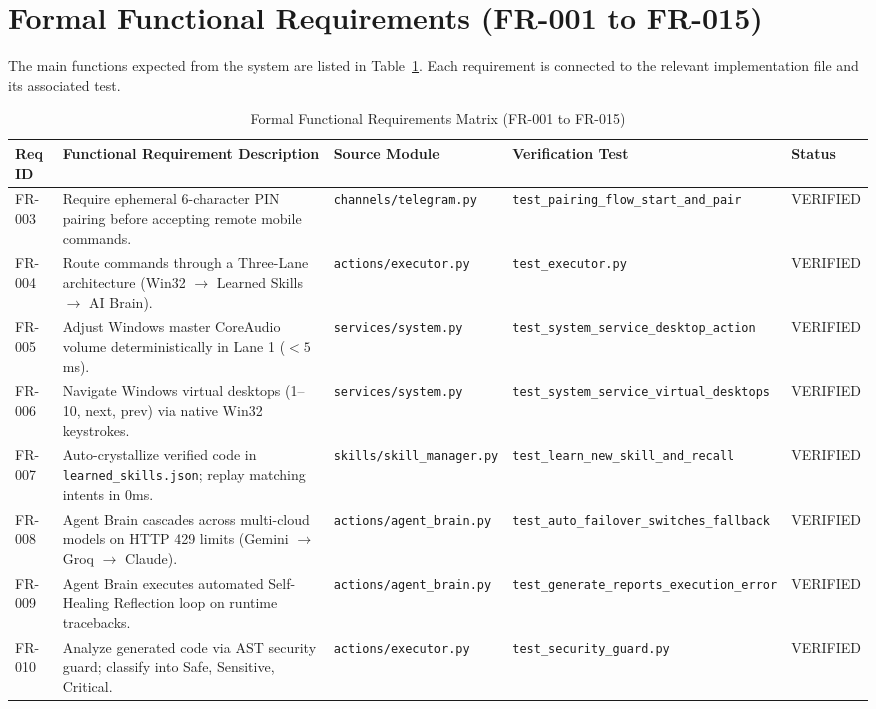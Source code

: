 \documentclass[12pt,letterpaper,oneside]{report}
\begin{document}
\section{Formal Functional Requirements (FR-001 to FR-015)}
The main functions expected from the system are listed in Table~\ref{tab:fr_matrix}. Each requirement is connected to the relevant implementation file and its associated test.

\begin{table}[H]
\centering
\caption{Formal Functional Requirements Matrix (FR-001 to FR-015)}
\label{tab:fr_matrix}
\begin{tabularx}{\textwidth}{|l|X|l|l|l|}
\hline
\textbf{Req ID} & \textbf{Functional Requirement Description} & \textbf{Source Module} & \textbf{Verification Test} & \textbf{Status}\\ \hline
FR-003 & Require ephemeral 6-character PIN pairing before accepting remote mobile commands. & \texttt{channels/telegram.py} & \texttt{test\_pairing\_flow\_start\_and\_pair} & VERIFIED\\ \hline
FR-004 & Route commands through a Three-Lane architecture (Win32 $\to$ Learned Skills $\to$ AI Brain). & \texttt{actions/executor.py} & \texttt{test\_executor.py} & VERIFIED\\ \hline
FR-005 & Adjust Windows master CoreAudio volume deterministically in Lane 1 ($<5$\,ms). & \texttt{services/system.py} & \texttt{test\_system\_service\_desktop\_action} & VERIFIED\\ \hline
FR-006 & Navigate Windows virtual desktops (1–10, next, prev) via native Win32 keystrokes. & \texttt{services/system.py} & \texttt{test\_system\_service\_virtual\_desktops} & VERIFIED\\ \hline
FR-007 & Auto-crystallize verified code in \texttt{learned\_skills.json}; replay matching intents in 0ms. & \texttt{skills/skill\_manager.py} & \texttt{test\_learn\_new\_skill\_and\_recall} & VERIFIED\\ \hline
FR-008 & Agent Brain cascades across multi-cloud models on HTTP 429 limits (Gemini $\to$ Groq $\to$ Claude). & \texttt{actions/agent\_brain.py} & \texttt{test\_auto\_failover\_switches\_fallback} & VERIFIED\\ \hline
FR-009 & Agent Brain executes automated Self-Healing Reflection loop on runtime tracebacks. & \texttt{actions/agent\_brain.py} & \texttt{test\_generate\_reports\_execution\_error} & VERIFIED\\ \hline
FR-010 & Analyze generated code via AST security guard; classify into Safe, Sensitive, Critical. & \texttt{actions/executor.py} & \texttt{test\_security\_guard.py} & VERIFIED\\ \hline

\end{tabularx}
\end{table}
\end{document}
